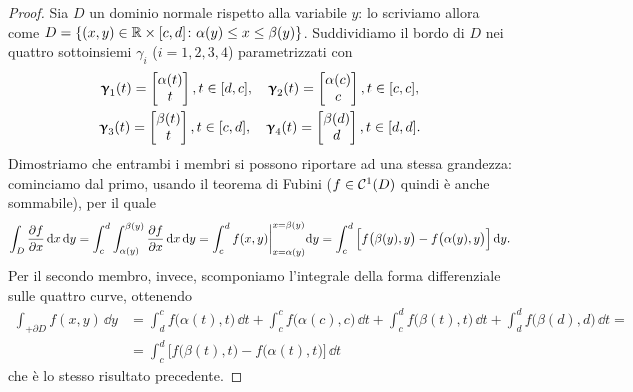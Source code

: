 \begin{proof}
	Sia $D$ un dominio normale rispetto alla variabile $y$: lo scriviamo allora come $D=\{(x,y)\in\mathbb{R}\times[c,d]\colon \alpha(y)\leq x\leq\beta(y)\}$.
	Suddividiamo il bordo di $D$ nei quattro sottoinsiemi $\gamma_i$ ($i=1,2,3,4$) parametrizzati con
	\begin{gather*}
		\bm{\upgamma}_1(t)=
		\begin{bmatrix}
			\alpha(t)\\t
		\end{bmatrix}, t\in[d,c],\quad
		\bm{\upgamma}_2(t)=
		\begin{bmatrix}
			\alpha(c)\\c
		\end{bmatrix}, t\in[c,c],\\
		\bm{\upgamma}_3(t)=
		\begin{bmatrix}
			\beta(t)\\t
		\end{bmatrix}, t\in[c,d],\quad 
		\bm{\upgamma}_4(t)=
		\begin{bmatrix}
			\beta(d)\\d
		\end{bmatrix}, t\in[d,d].
	\end{gather*}
	Dimostriamo che entrambi i membri si possono riportare ad una stessa grandezza: cominciamo dal primo, usando il teorema di Fubini ($f\in\mathcal{C}^{{1}}(D)$ quindi è anche sommabile), per il quale
	\begin{equation}
		\int_D\frac{\partial {f}}{\partial {x}}\,\textup{d} x\,\textup{d} y=\int_c^d\int_{\alpha(y)}^{\beta(y)}\frac{\partial {f}}{\partial {x}}\,\textup{d} x\,\textup{d} y=\int_c^df(x,y)\bigg|_{x=\alpha(y)}^{x=\beta(y)}\textup{d} y=\int_c^d\Big[f\big(\beta(y),y\big)-f\big(\alpha(y),y\big)\Big]\,\textup{d} y.
	\end{equation}
	Per il secondo membro, invece, scomponiamo l'integrale della forma differenziale sulle quattro curve, ottenendo
	\begin{equation}
		\begin{split}
			\int_{+\partial D}f(x,y)\,\dd y&=\int_d^cf\big(\alpha(t),t\big)\,\dd t+\int_c^cf\big(\alpha(c),c\big)\,\dd t+\int_c^df\big(\beta(t),t\big)\,\dd t+\int_d^df\big(\beta(d),d\big)\,\dd t=\\
			&=\int_c^d\Big[f\big(\beta(t),t\big)-f\big(\alpha(t),t\big)\Big]\,\dd t
		\end{split}
	\end{equation}
	che è lo stesso risultato precedente.


\end{proof}
